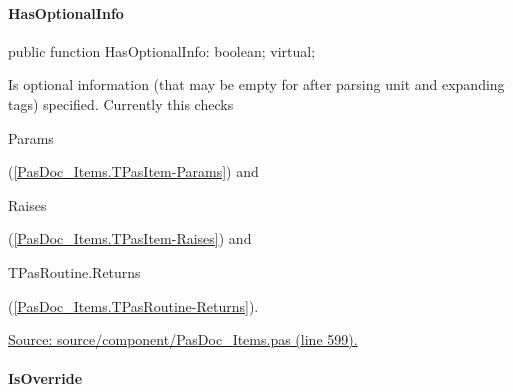 \documentclass{report}
\newif\ifpdf
\begin{document}
\paragraph*{HasOptionalInfo}\hspace*{\fill}

\label{PasDoc_Items.TPasItem-HasOptionalInfo}
\begin{list}{}{
\setlength{\itemindent}{0cm}
\setlength{\listparindent}{0cm}
\setlength{\leftmargin}{\evensidemargin}
\addtolength{\leftmargin}{\tmplength}
\settowidth{\labelsep}{X}
\addtolength{\leftmargin}{\labelsep}
\setlength{\labelwidth}{\tmplength}
}
\item[\textbf{Declaration}\hfill]
\ifpdf
\begin{flushleft}
\fi
\begin{ttfamily}
public function HasOptionalInfo: boolean; virtual;\end{ttfamily}

\ifpdf
\end{flushleft}
\fi

\par
\item[\textbf{Description}]
Is optional information (that may be empty for after parsing unit and expanding tags) specified. Currently this checks \begin{ttfamily}Params\end{ttfamily}(\ref{PasDoc_Items.TPasItem-Params}) and \begin{ttfamily}Raises\end{ttfamily}(\ref{PasDoc_Items.TPasItem-Raises}) and \begin{ttfamily}TPasRoutine.Returns\end{ttfamily}(\ref{PasDoc_Items.TPasRoutine-Returns}).\par
\href{https://github.com/pasdoc/pasdoc/blob/master/source/component/PasDoc_Items.pas#L599}{Source: source/component/PasDoc{\_}Items.pas (line 599).}

\end{list}
\paragraph*{IsOverride}\hspace*{\fill}
\end{document}
